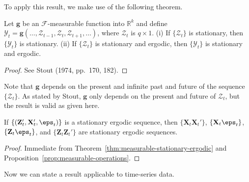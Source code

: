 To apply this result, we make use of the following theorem.

\begin{theorem}\label{thm:measurable-stationary-ergodic}
Let $\mathbf{g}$ be an $\mathcal{F}$-measurable function into $\mathbb{R}^k$ and define $\boldsymbol{\mathcal{Y}}_t = \mathbf{g}(\ldots, \boldsymbol{\mathcal{Z}}_{t-1}, \boldsymbol{\mathcal{Z}}_t, \boldsymbol{\mathcal{Z}}_{t+1}, \ldots)$, where $\boldsymbol{\mathcal{Z}}_t$ is $q \times 1$. (i) If $\{\boldsymbol{\mathcal{Z}}_t\}$ is stationary, then $\{\boldsymbol{\mathcal{Y}}_t\}$ is stationary. (ii) If $\{\boldsymbol{\mathcal{Z}}_t\}$ is stationary and ergodic, then $\{\boldsymbol{\mathcal{Y}}_t\}$ is stationary and ergodic.
\end{theorem}

\begin{proof}
See Stout (1974, pp.~170, 182). \qedhere
\end{proof}

Note that $\mathbf{g}$ depends on the present and infinite past and future of the sequence $\{\boldsymbol{\mathcal{Z}}_t\}$. As stated by Stout, $\mathbf{g}$ only depends on the present and future of $\boldsymbol{\mathcal{Z}}_t$, but the result is valid as given here.

\begin{proposition}\label{prop:stationary-ergodic-products}
If $\{(\mathbf{Z}_t', \mathbf{X}_t', \eps_t)\}$ is a stationary ergodic sequence, then $\{\mathbf{X}_t \mathbf{X}_t'\}$, $\{\mathbf{X}_t \eps_t\}$, $\{\mathbf{Z}_t \eps_t\}$, and $\{\mathbf{Z}_t \mathbf{Z}_t'\}$ are stationary ergodic sequences.
\end{proposition}

\begin{proof}
Immediate from Theorem~\ref{thm:measurable-stationary-ergodic} and Proposition~\ref{prop:measurable-operations}. \qedhere
\end{proof}

Now we can state a result applicable to time-series data.

